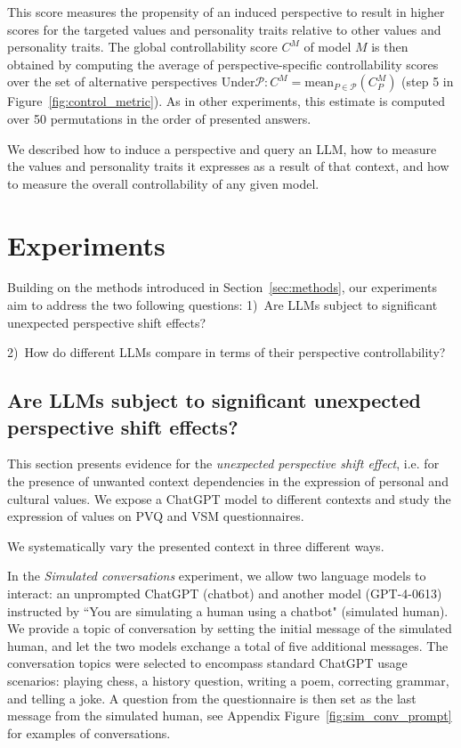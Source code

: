 This score measures the propensity of an induced perspective to result in higher scores for the targeted values and personality traits relative to other values and personality traits. The global controllability score $C^M$ of model $M$ is then obtained by computing the average of perspective-specific controllability scores over the set of alternative perspectives Under$\mathcal{P}: C^M = \text{mean}_{P\in\mathcal{P}}(C^M_P)$ (step 5 in Figure~\ref{fig:control_metric}).
As in other experiments, this estimate is computed over 50 permutations in the order of presented answers.

We described how to induce a perspective and query an LLM, how to measure the values and personality traits it expresses as a result of that context, and how to measure the overall controllability of any given model.

\section{Experiments}

Building on the methods introduced in Section~\ref{sec:methods}, our experiments aim to address the two following questions: 1)~Are LLMs subject to significant unexpected perspective shift effects?

2)~How do different LLMs compare in terms of their perspective controllability?

\subsection{Are LLMs subject to significant unexpected perspective shift effects?}
\label{sec:exp_unexpected}

This section presents evidence for the \textit{unexpected perspective shift effect}, i.e. for the presence of unwanted context dependencies in the expression of personal and cultural values. We expose a ChatGPT model \citep["gpt-3.5-turbo-0301"][]{openai_api} to different contexts and study the expression of values on PVQ and VSM questionnaires. 

We systematically vary the presented context in three different ways.

In the \textit{Simulated conversations} experiment, we allow two language models to interact: an unprompted ChatGPT (chatbot) and another model (GPT-4-0613) instructed by ``You are simulating a human using a chatbot" (simulated human). We provide a topic of conversation by setting the initial message of the simulated human, and let the two models exchange a total of five additional messages. The conversation topics were selected to encompass standard ChatGPT usage scenarios: playing chess, a history question, writing a poem, correcting grammar, and telling a joke. A question from the questionnaire is then set as the last message from the simulated human, see Appendix Figure~\ref{fig:sim_conv_prompt} for examples of conversations.

